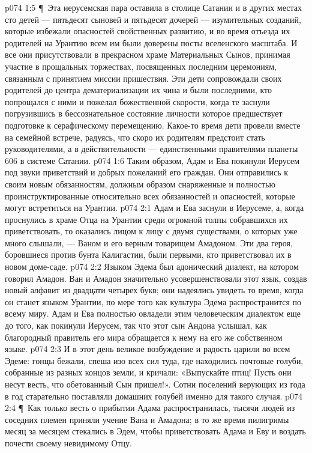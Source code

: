 \vs p074 1:5 \P\ Эта иерусемская пара оставила в столице Сатании и в других местах сто детей --- пятьдесят сыновей и пятьдесят дочерей --- изумительных созданий, которые избежали опасностей свойственных развитию, и во время отъезда их родителей на Урантию всем им были доверены посты вселенского масштаба. И все они присутствовали в прекрасном храме Материальных Сынов, принимая участие в прощальных торжествах, посвященных последним церемониям, связанным с принятием миссии пришествия. Эти дети сопровождали своих родителей до центра дематериализации их чина и были последними, кто попрощался с ними и пожелал божественной скорости, когда те заснули погрузившись в бессознательное состояние личности которое предшествует подготовке к серафическому перемещению. Какое\hyp{}то время дети провели вместе на семейной встрече, радуясь, что скоро их родителям предстоит стать руководителями, а в действительности --- единственными правителями планеты 606 в системе Сатании.
\vs p074 1:6 Таким образом, Адам и Ева покинули Иерусем под звуки приветствий и добрых пожеланий его граждан. Они отправились к своим новым обязанностям, должным образом снаряженные и полностью проинструктированные относительно всех обязанностей и опасностей, которые могут встретиться на Урантии.
\vs p074 2:1 Адам и Ева заснули в Иерусеме, а, когда проснулись в храме Отца на Урантии среди огромной толпы собравшихся их приветствовать, то оказались лицом к лицу с двумя существами, о которых уже много слышали, --- Ваном и его верным товарищем Амадоном. Эти два героя, боровшиеся против бунта Калигастии, были первыми, кто приветствовал их в новом доме\hyp{}саде.
\vs p074 2:2 Языком Эдема был адонический диалект, на котором говорил Амадон. Ван и Амадон значительно усовершенствовали этот язык, создав новый алфавит из двадцати четырех букв; они надеялись увидеть то время, когда он станет языком Урантии, по мере того как культура Эдема распространится по всему миру. Адам и Ева полностью овладели этим человеческим диалектом еще до того, как покинули Иерусем, так что этот сын Андона услышал, как благородный правитель его мира обращается к нему на его же собственном языке.
\vs p074 2:3 И в этот день великое возбуждение и радость царили во всем Эдеме: гонцы бежали, спеша изо всех сил туда, где находились почтовые голуби, собранные из разных концов земли, и кричали: «Выпускайте птиц! Пусть они несут весть, что обетованный Сын пришел!». Сотни поселений верующих из года в год старательно поставляли домашних голубей именно для такого случая.
\vs p074 2:4 \P\ Как только весть о прибытии Адама распространилась, тысячи людей из соседних племен приняли учение Вана и Амадона; в то же время пилигримы месяц за месяцем стекались в Эдем, чтобы приветствовать Адама и Еву и воздать почести своему невидимому Отцу.
